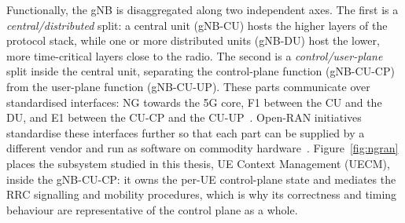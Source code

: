 \documentclass[english,oneside,a4paper,censored,csm,software-track-2020]{HYthesisML}
\begin{document}
Functionally, the gNB is disaggregated along two independent axes. The first is a
\emph{central/distributed} split: a central unit (gNB-CU) hosts the higher layers of the
protocol stack, while one or more distributed units (gNB-DU) host the lower, more
time-critical layers close to the radio. The second is a \emph{control/user-plane} split
inside the central unit, separating the control-plane function (gNB-CU-CP) from the
user-plane function (gNB-CU-UP). These parts communicate over standardised
interfaces: NG towards the 5G core, F1 between the CU and the DU, and E1 between the CU-CP and
the CU-UP~\cite{3gpp38401,3gpp38300,3gpp38463}. Open-RAN initiatives standardise these interfaces
further so that each part can be supplied by a different vendor and run as software on
commodity hardware~\cite{polese2023oran}. Figure~\ref{fig:ngran} places the subsystem studied
in this thesis, UE Context Management (UECM), inside the gNB-CU-CP: it owns the per-UE
control-plane state and mediates the RRC signalling and mobility procedures, which is why its
correctness and timing behaviour are representative of the control plane as a whole.
\end{document}
